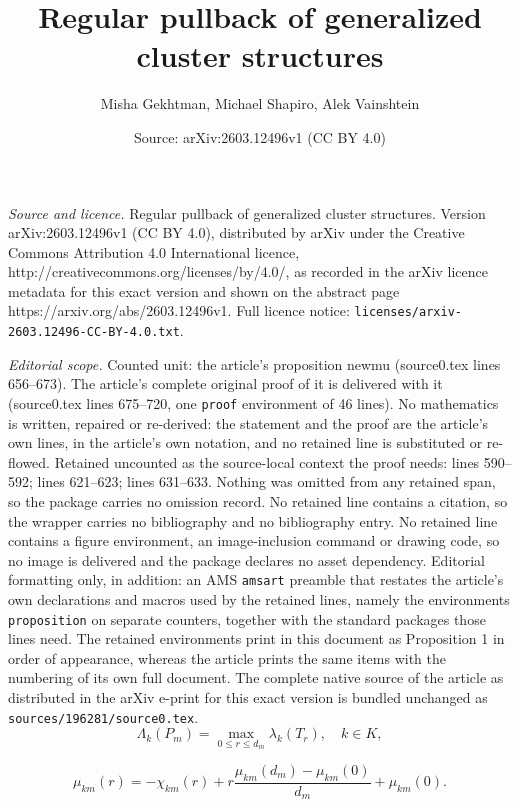 \documentclass[10pt,a4paper]{amsart}
\title{Regular pullback of generalized cluster structures}
\author{Misha Gekhtman, Michael Shapiro, Alek Vainshtein}
\date{Source: arXiv:2603.12496v1 (CC BY 4.0)}
\begin{document}
\maketitle

\noindent\emph{Source and licence.} Regular pullback of generalized cluster structures. Version arXiv:2603.12496v1 (CC BY 4.0), distributed by arXiv under the Creative Commons Attribution 4.0 International licence, http://creativecommons.org/licenses/by/4.0/, as recorded in the arXiv licence metadata for this exact version and shown on the abstract page https://arxiv.org/abs/2603.12496v1. Full licence notice: \texttt{licenses/arxiv-2603.12496-CC-BY-4.0.txt}.\par\smallskip

\noindent\textit{Editorial scope.} Counted unit: the article's proposition newmu (source0.tex lines 656--673). The article's complete original proof of it is delivered with it (source0.tex lines 675--720, one \texttt{proof} environment of 46 lines). No mathematics is written, repaired or re-derived: the statement and the proof are the article's own lines, in the article's own notation, and no retained line is substituted or re-flowed.  Retained uncounted as the source-local context the proof needs: lines 590--592; lines 621--623; lines 631--633.  Nothing was omitted from any retained span, so the package carries no omission record.  No retained line contains a citation, so the wrapper carries no bibliography and no bibliography entry.  No retained line contains a figure environment, an image-inclusion command or drawing code, so no image is delivered and the package declares no asset dependency.  Editorial formatting only, in addition: an AMS \texttt{amsart} preamble that restates the article's own declarations and macros used by the retained lines, namely the environments \texttt{proposition} on separate counters, together with the standard packages those lines need.  The retained environments print in this document as Proposition 1 in order of appearance, whereas the article prints the same items with the numbering of its own full document.  The complete native source of the article as distributed in the arXiv e-print for this exact version is bundled unchanged as \texttt{sources/196281/source0.tex}.
\begin{equation}\label{cohcond}
\Lambda_k(P_m)=\max_{0\le r\le d_m}\lambda_k(T_r), \quad k\in K, 
\end{equation}

\begin{equation}\label{mutr}
\mu_{km}(r)=-\chi_{km}(r)+r\frac{\mu_{km}(d_m)-\mu_{km}(0)}{d_m}+\mu_{km}(0).
\end{equation}
\end{document}
